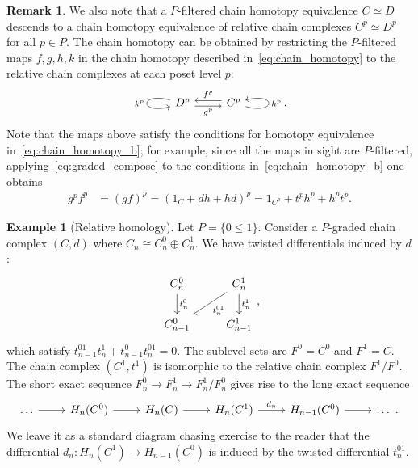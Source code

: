 \documentclass[11pt, table, nothms]{amsart}
\theoremstyle{definition}
\newtheorem{example}[theorem]{Example}
\newtheorem{remark}[theorem]{Remark}
\newcommand{\D}{D}
\newcommand{\rH}{H}
\newcommand{\C}{C}
\begin{document}
{\begin{remark} \label{rmk:relative_chain_homotopy} We also note that a $P$-filtered chain homotopy equivalence $C \simeq D$ descends to a chain homotopy equivalence of relative chain complexes $\C^p \simeq \D^p$ for all $p \in P$. The chain homotopy can be obtained by restricting the $P$-filtered maps $f,g,h,k$ in the chain homotopy described in~\cref{eq:chain_homotopy} to the relative chain complexes at each poset level $p$:
\[    \begin{tikzcd}
	\D^p & \C^p
	\arrow["k^p"', from=1-1, to=1-1, loop, in=195, out=165, distance=10mm]
	\arrow["g^p"', shift right, from=1-1, to=1-2]
	\arrow["f^p"', shift right, from=1-2, to=1-1]
	\arrow["h^p"', from=1-2, to=1-2, loop, in=15, out=345, distance=10mm]
\end{tikzcd}.\]
Note that the maps above satisfy the conditions for homotopy equivalence in~\cref{eq:chain_homotopy_b}; for example, since all the maps in sight are $P$-filtered, applying~\cref{eq:graded_compose} to the conditions in~\cref{eq:chain_homotopy_b} one obtains
\begin{align*}
  g^p f^p &= (gf)^p = (1_C + dh + hd)^p  =1_{\C^p}+ t^p h^p + h^p t^p.
\end{align*}
\end{remark}
\begin{example}[Relative homology] \label{ex:relhom} Let $P = \{0 \leq 1\}$. Consider a $P$-graded chain complex $(C,d)$ where $C_n \cong  \C_n^0 \oplus \C^1_n$. We have twisted differentials induced by $d$:
    \[\begin{tikzcd}
	{\C_n^0} & {\C_n^1} \\
	{\C^0_{n-1}} & {\C^1_{n-1}}
	\arrow["{t^{0}_n}", from=1-1, to=2-1]
	\arrow["{t^{01}_n}", from=1-2, to=2-1]
	\arrow["{t^{1}_n}", from=1-2, to=2-2]
\end{tikzcd},\]
which satisfy $t^{01}_{n-1} t^{1}_n +  t^{0}_{n-1} t^{01}_{n}= 0$. 
The sublevel sets are $F^0 = \C^0$ and $F^1 = C$. The chain complex $(\C^1, t^1)$ is isomorphic to the relative chain complex $F^1/F^0$.  The short exact sequence $F_n^{0} \to F_n^{1} \to F^1_n/F^0_n$ gives rise to the long exact sequence
\[
\begin{tikzcd}
   \dots \ar[r] & 
   \rH_n(\C^0) \ar[r] & 
   \rH_n(C) \ar[r] & 
   \rH_n(\C^1) \ar[r, "d_n"
   ] & 
   \rH_{n-1}(\C^0) \ar[r] & 
   \dots \ .
\end{tikzcd}
\]
We leave it as a standard diagram chasing exercise to the reader that the differential 
$
d_n\colon \rH_n(\C^1)  \to \rH_{n -1}(\C^0)
$ 
is induced by the twisted differential $t^{01}_n$. 
\end{example}

}
\end{document}
